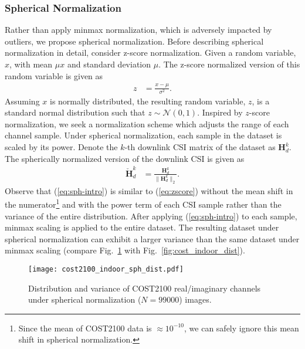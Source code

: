 
\subsubsection{Spherical Normalization}
\label{sect:sph_norm_method}
Rather than apply minmax normalization, which is adversely impacted by outliers, we propose spherical normalization. Before describing spherical normalization in detail, consider z-score normalization. Given a random variable, $x$, with mean $\mu x$ and standard deviation $\mu$. The z-score normalized version of this random variable is given as
\begin{align}
	z &= \frac{x - \mu}{\sigma^2}. \label{eq:zscore}
\end{align}
Assuming $x$ is normally distributed, the resulting random variable, $z$, is a standard normal distribution such that $z \sim \mathcal N(0,1)$. Inspired by $z$-score normalization, we seek a normalization scheme which adjusts the range of each channel sample. Under spherical normalization, each sample in the dataset is scaled by its power. Denote the $k$-th downlink CSI matrix of the dataset as $\mathbf H_d^k$. The spherically normalized version of the downlink CSI is given as
\begin{align}
	\mathbf{\check H}_d^k &= \frac{\mathbf H_d^k}{\|\mathbf H_d^k\|_2}. \label{eq:sph-intro}
\end{align}
Observe that (\ref{eq:sph-intro}) is similar to (\ref{eq:zscore}) without the mean shift in the numerator\footnote{Since the mean of COST2100 data is $\approx 10^{-10}$, we can safely ignore this mean shift in spherical normalization.} and with the power term of each CSI sample rather than the variance of the entire distribution. After applying (\ref{eq:sph-intro}) to each sample, minmax scaling is applied to the entire dataset. The resulting dataset under spherical normalization can exhibit a larger variance than the same dataset under minmax scaling (compare Fig.~\ref{fig:cost_indoor_sph_dist} with Fig.~\ref{fig:cost_indoor_dist}). 
\begin{figure}[htb]
	\centering
	\texttt{[image: cost2100\_indoor\_sph\_dist.pdf]}
	\medskip
	\caption{Distribution and variance of COST2100 real/imaginary channels under spherical normalization ($N=99000$) images.}
	\label{fig:cost_indoor_sph_dist}
\end{figure}

